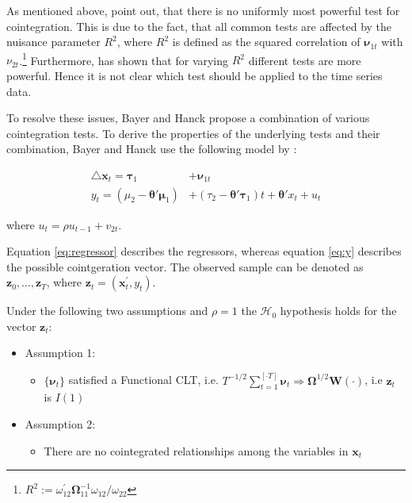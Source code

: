 \documentclass[11.5pt,a4paper]{article}
\let\rmarkdownfootnote\footnote%
\def\footnote{\protect\rmarkdownfootnote}
\begin{document}
As mentioned above, \textcite{Bayerhanck2009} point out, that there is
no uniformly most powerful test for cointegration. This is due to the
fact, that all common tests are affected by the nuisance parameter
\(R^2\), where \(R^2\) is defined as the squared correlation of
\(\pmb{\nu}_{1t}\) with \(\nu_{2t}\).\footnote{\(R^2:= \omega_{12}^{'} \pmb{\Omega}_{11}^{-1}\omega_{12} / \omega_{22}\)}
Furthermore, \textcite{pesavento2004} has shown that for varying \(R^2\)
different tests are more powerful. Hence it is not clear which test
should be applied to the time series data.

To resolve these issues, Bayer and Hanck propose a combination of
various cointegration tests. To derive the properties of the underlying
tests and their combination, Bayer and Hanck use the following model by
\textcite{pesavento2004}:

\begin{align}
\label{eq:regressor}
\triangle \pmb{x}_t = \pmb{\tau}_1 &+  \pmb{\nu}_{1t}\\
\label{eq:y}
y_t  = \left(\mu_2 - \pmb{\theta}' \pmb{\mu}_1 \right) &+ \left(\tau_2 - \pmb{\theta}' \pmb{\tau}_1 \right)t + \pmb{\theta}' x_t + u_t \nonumber
\end{align}

where \(u_t = \rho u_{t-1} + v_{2t}\).

Equation \eqref{eq:regressor} describes the regressors, whereas equation
\eqref{eq:y} describes the possible cointgeration vector. The observed
sample can be denoted as \(\pmb{z}_0, \ldots , \pmb{z}_T\), where
\(\pmb{z}_t = (\pmb{x}_t^{'}, y_t)\).

Under the following two assumptions and \(\rho = 1\) the
\(\mathcal{H}_0\) hypothesis holds for the vector \(\pmb{z}_t\):

\begin{itemize}
  \item[] Assumption 1: 
  \begin{itemize}
    \item[] $\{ \pmb{\nu}_t \}$ satisfied a Functional CLT, i.e. $\displaystyle T^{-1/2} \sum_{t = 1}^{[\cdot T]} \pmb{\nu}_t \Rightarrow \pmb{\Omega}^{1/2} \pmb{W}(\cdot)$, i.e $\pmb{z}_t$ is $I(1)$  
  \end{itemize}
  \item[] Assumption 2:
  \begin{itemize}
    \item[] There are no cointegrated relationships among the variables in $\pmb{x}_t$
  \end{itemize}
\end{itemize}
\end{document}
